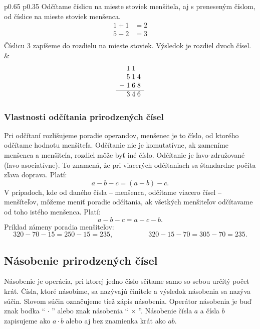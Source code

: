 \documentclass{article}
\begin{document}
\begin{longtable}{p{} p{}}
Odčítame číslicu na mieste stoviek menšiteľa, aj s preneseným číslom, od číslice na mieste stoviek menšenca.
\[
\begin{aligned}
  1 + 1 &= 2 \\
  5 - 2 &= 3 \\
\end{aligned}
\]
Číslicu \(3\) zapíšeme do rozdielu na mieste stoviek. Výsledok je rozdiel dvoch čísel.
&
\[
\begin{array}{c@{\;}c@{\;}c@{\;}c}
    & 1 & 1 &   \\
    & 5 & 1 & 4 \\
  - & 1 & 6 & 8 \\
  \hline
    & 3 & 4 & 6 \\
\end{array}
\]

\end{longtable}

\subsubsection{Vlastnosti odčítania prirodzených čísel}

Pri odčítaní rozlišujeme poradie operandov, menšenec je to číslo, od ktorého odčítame hodnotu menšiteľa. Odčítanie nie je komutatívne, ak zameníme menšenca a menšiteľa, rozdiel môže byť iné číslo. Odčítanie je ľavo-združované (ľavo-asociatívne). To znamená, že pri viacerých odčítaniach sa štandardne počíta zľava doprava. Platí:
\[
a - b - c = (a - b) - c.
\]
V prípadoch, kde od daného čísla ‒ menšenca, odčítame viacero čísel ‒ menšíteľov, môžeme meniť poradie odčítania, ak všetkých menšiteľov odčítavame od toho istého menšenca. Platí:
\[
a - b - c = a - c - b.
\]
Príklad zámeny poradia menšiteľov:
\[
320 - 70 - 15 = 250 - 15 = 235, \hspace{5em} 320 - 15 - 70 = 305 - 70 = 235.
\]

\subsection{Násobenie prirodzených čísel}

Násobenie je operácia, pri ktorej jedno číslo sčítame samo so sebou určítý počet krát. Čísla, ktoré násobíme, sa nazývajú činitele a výsledok násobenia sa nazýva súčin. Slovom súčin označujeme tiež zápis násobenia. Operátor násobenia je buď znak bodka \enquote{\(\, \cdot\, \)} alebo znak násobenia \enquote{\(\, \times \,\)}. Násobenie čísla \(a\) a čísla \(b\) zapisujeme ako \(a \cdot b\) alebo aj bez znamienka krát ako \(ab\).
\end{document}
